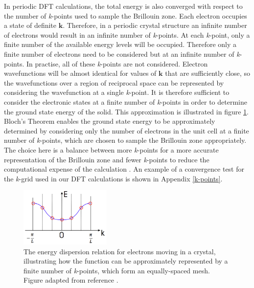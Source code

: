 In periodic DFT calculations, the total energy is also converged with respect to  the number of \textit{k}-points used to sample the Brillouin zone.
Each electron occupies a state of definite $\mathbf{k}$. Therefore, in a periodic crystal structure an infinite number of electrons would result in an infinite number of \textit{k}-points. At each \textit{k}-point, only a finite number of the available energy levels will be occupied. Therefore only a finite number of electrons need to be considered but at an infinite number of \textit{k}-points. In practise, all of these \textit{k}-points are not considered. 
Electron wavefunctions will be almost identical for values of $\mathbf{k}$ that are sufficiently close, so the wavefunctions over a region of reciprocal space can be represented by considering the wavefunction at a single \textit{k}-point. It is therefore sufficient to consider the electronic states at a finite number of \textit{k}-points in order to determine the ground state energy of the solid. This approximation is illustrated in figure \ref{energy_dispersion}. Bloch's Theorem enables the ground state energy to be approximately determined by considering only the number of electrons in the unit cell at a finite number of \textit{k}-points, which are chosen to sample the Brillouin zone appropriately. The choice here is a balance between more \textit{k}-points for a more accurate representation of the Brillouin zone and fewer \textit{k}-points to reduce the computational expense of the calculation \cite{bloch-thesis}. An example of a convergence test for the \textit{k}-grid used in our DFT calculations is shown in Appendix \ref{k-points}. 
\begin{figure}[h!]
  \centering
    \includegraphics[width=0.4\textwidth]{figures/energy_dispersion.png}
    \caption{The energy dispersion relation for electrons moving in a crystal, illustrating how the function can be approximately represented by a finite number of \textit{k}-points, which form an equally-spaced mesh. Figure adapted from reference .}
  \label{energy_dispersion}
\end{figure}

